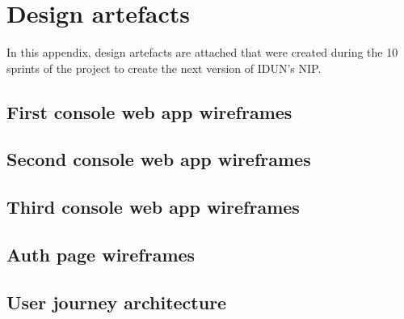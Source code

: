 \chapter{Design artefacts}
\label{appendix5-design-artefacts}

In this appendix, design artefacts are attached that were created during the 10 sprints of the project to create the next version of IDUN's NIP.

\section*{First console web app wireframes}

\section*{Second console web app wireframes}

\section*{Third console web app wireframes}


\section*{Auth page wireframes}

\section*{User journey architecture}
